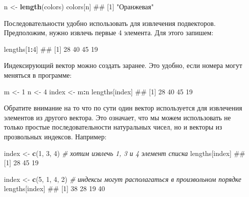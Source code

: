 \documentclass[]{book}
\newenvironment{Shaded}{\begin{snugshade}}{\end{snugshade}}
\newcommand{\KeywordTok}[1]{\textcolor[rgb]{0.13,0.29,0.53}{\textbf{#1}}}
\newcommand{\DecValTok}[1]{\textcolor[rgb]{0.00,0.00,0.81}{#1}}
\newcommand{\StringTok}[1]{\textcolor[rgb]{0.31,0.60,0.02}{#1}}
\newcommand{\CommentTok}[1]{\textcolor[rgb]{0.56,0.35,0.01}{\textit{#1}}}
\newcommand{\OperatorTok}[1]{\textcolor[rgb]{0.81,0.36,0.00}{\textbf{#1}}}
\newcommand{\NormalTok}[1]{#1}
\begin{document}
\begin{Shaded}
\begin{Highlighting}[]
\NormalTok{n <-}\StringTok{ }\KeywordTok{length}\NormalTok{(colors)}
\NormalTok{colors[n]}
\NormalTok{## [1] "Оранжевая"}
\end{Highlighting}
\end{Shaded}

Последовательности удобно использовать для извлечения подвекторов.
Предположим, нужно извлечь первые 4 элемента. Для этого запишем:

\begin{Shaded}
\begin{Highlighting}[]
\NormalTok{lengths[}\DecValTok{1}\OperatorTok{:}\DecValTok{4}\NormalTok{]}
\NormalTok{## [1] 28 40 45 19}
\end{Highlighting}
\end{Shaded}

Индексирующий вектор можно создать заранее. Это удобно, если номера
могут меняться в программе:

\begin{Shaded}
\begin{Highlighting}[]
\NormalTok{m <-}\StringTok{ }\DecValTok{1}
\NormalTok{n <-}\StringTok{ }\DecValTok{4}
\NormalTok{index <-}\StringTok{ }\NormalTok{m}\OperatorTok{:}\NormalTok{n}
\NormalTok{lengths[index]}
\NormalTok{## [1] 28 40 45 19}
\end{Highlighting}
\end{Shaded}

Обратите внимание на то что по сути один вектор используется для
извлечения элементов из другого вектора. Это означает, что мы можем
использовать не только простые последовательности натуральных чисел, но
и векторы из прозвольных индексов. Например:

\begin{Shaded}
\begin{Highlighting}[]
\NormalTok{index <-}\StringTok{ }\KeywordTok{c}\NormalTok{(}\DecValTok{1}\NormalTok{, }\DecValTok{3}\NormalTok{, }\DecValTok{4}\NormalTok{) }\CommentTok{# хотим извлечь 1, 3 и 4 элемент списка}
\NormalTok{lengths[index]}
\NormalTok{## [1] 28 45 19}

\NormalTok{index <-}\StringTok{ }\KeywordTok{c}\NormalTok{(}\DecValTok{5}\NormalTok{, }\DecValTok{1}\NormalTok{, }\DecValTok{4}\NormalTok{, }\DecValTok{2}\NormalTok{) }\CommentTok{# индексы могут располагаться в произвольном порядке}
\NormalTok{lengths[index]}
\NormalTok{## [1] 38 28 19 40}
\end{Highlighting}
\end{Shaded}
\end{document}
